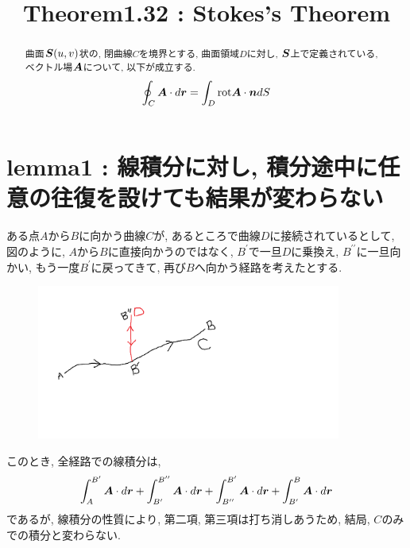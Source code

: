 \documentclass{jsarticle}
\title{Theorem1.32 : Stokes's Theorem}
\newcommand*{\mbold}[1]{\mbox{\boldmath $#1$}}
\newcommand*{\rot}{{\rm rot}}
\begin{document}
\maketitle

\begin{abstract}
  曲面$\mbold{S}(u, v)$状の, 閉曲線$C$を境界とする, 曲面領域$D$に対し, 
  $\mbold{S}$上で定義されている, ベクトル場$\mbold{A}$について, 以下が成立する. 
  \begin{eqnarray}
    \oint_C \mbold{A}\cdot d\mbold{r} = \int_D \rot \mbold{A} \cdot \mbold{n} dS
  \end{eqnarray}
\end{abstract}

\section{lemma1 : 線積分に対し, 積分途中に任意の往復を設けても結果が変わらない}
ある点$A$から$B$に向かう曲線$C$が, あるところで曲線$D$に接続されているとして, 
図のように, $A$から$B$に直接向かうのではなく, $B^\prime$で一旦$D$に乗換え, $B^{\prime\prime}$に一旦向かい, もう一度$B^\prime$に戻ってきて, 再び$B$へ向かう経路を考えたとする. 
\begin{figure}[htbp]
  \begin{center}
    \includegraphics[width=10cm]{Figure/RouteAdd.png}
  \end{center}
\end{figure}

このとき, 全経路での線積分は, 
\begin{equation}
  \int_A^{B^\prime} \mbold{A}\cdot d\mbold{r} 
  + \int_{B^\prime}^{B^{\prime\prime}} \mbold{A}\cdot d\mbold{r} 
  + \int_{B^{\prime\prime}}^{B^\prime} \mbold{A}\cdot d\mbold{r} 
  + \int_{B^\prime}^B \mbold{A}\cdot d\mbold{r} 
\end{equation}
であるが, 線積分の性質により, 第二項, 第三項は打ち消しあうため, 結局, $C$のみでの積分と変わらない. 
\end{document}

